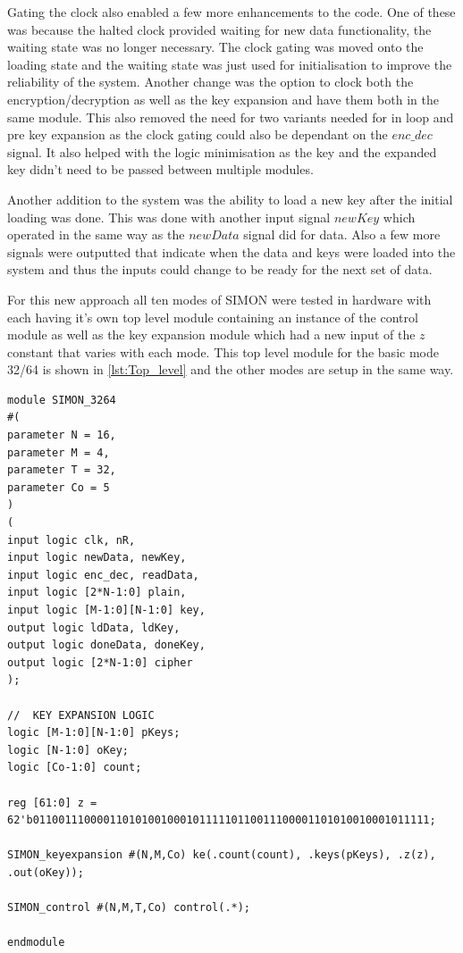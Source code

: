 \documentclass[12pt,twoside,a4paper]{report}
\begin{document}
	Gating the clock also enabled a few more enhancements to the code. One of these was because the halted clock provided waiting for new data functionality, the waiting state was no longer necessary. The clock gating was moved onto the loading state and the waiting state was just used for initialisation to improve the reliability of the system. Another change was the option to clock both the encryption/decryption as well as the key expansion and have them both in the same module. This also removed the need for two variants needed for in loop and pre key expansion as the clock gating could also be dependant on the $enc\_dec$ signal. It also helped with the logic minimisation as the key and the expanded key didn't need to be passed between multiple modules.
	
	Another addition to the system was the ability to load a new key after the initial loading was done. This was done with another input signal $newKey$ which operated in the same way as the $newData$ signal did for data. Also a few more signals were outputted that indicate when the data and keys were loaded into the system and thus the inputs could change to be ready for the next set of data.
	
	For this new approach all ten modes of SIMON were tested in hardware with each having it's own top level module containing an instance of the control module as well as the key expansion module which had a new input of the $z$ constant that varies with each mode. This top level module for the basic mode 32/64 is shown in \autoref{lst:Top_level} and the other modes are setup in the same way.

	\begin{minipage}{\linewidth}
	\begin{lstlisting}[label={lst:Top_level},caption={The next state logic for the ($PRE$) control module},style=CStyle]
module SIMON_3264
#(
parameter N = 16,
parameter M = 4,
parameter T = 32,		
parameter Co = 5
)
(
input logic clk, nR,
input logic newData, newKey,
input logic enc_dec, readData,
input logic [2*N-1:0] plain,
input logic [M-1:0][N-1:0] key,
output logic ldData, ldKey,
output logic doneData, doneKey,
output logic [2*N-1:0] cipher
);

//	KEY EXPANSION LOGIC
logic [M-1:0][N-1:0] pKeys;
logic [N-1:0] oKey;
logic [Co-1:0] count;

reg [61:0] z = 62'b01100111000011010100100010111110110011100001101010010001011111;

SIMON_keyexpansion #(N,M,Co) ke(.count(count), .keys(pKeys), .z(z), .out(oKey));

SIMON_control #(N,M,T,Co) control(.*);

endmodule
	\end{lstlisting}
	\end{minipage}
\end{document}
